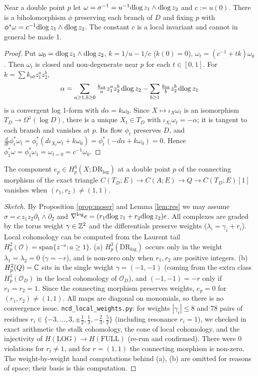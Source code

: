\begin{prop}\tP\label{prop:moser}
Near a double point $p$ let $\omega=\sigma^{-1}=u^{-1}\mathrm{dlog}\, z_1\wedge\mathrm{dlog}\, z_2$ and $c:=u(0)$. There is a biholomorphism $\phi$ preserving each branch of $D$ and fixing $p$ with $\phi^*\omega=c^{-1}\mathrm{dlog}\, z_1\wedge\mathrm{dlog}\, z_2$. The constant $c$ is a local invariant and cannot in general be made 1.
\end{prop}
\begin{proof}
Put $\omega_0=\mathrm{dlog}\, z_1\wedge\mathrm{dlog}\, z_2$, $k=1/u-1/c$ ($k(0)=0$), $\omega_t=(c^{-1}+tk)\omega_0$. Then $\omega_t$ is closed and non-degenerate near $p$ for each $t\in[0,1]$. For $k=\sum k_{ab}z_1^az_2^b$,
\[\alpha=\sum_{a\ge1,b\ge0}\tfrac{k_{ab}}{a}z_1^az_2^b\,\mathrm{dlog}\, z_2-\sum_{b\ge1}\tfrac{k_{0b}}{b}z_2^b\,\mathrm{dlog}\, z_1\]
is a convergent log 1-form with $d\alpha=k\omega_0$. Since $X\mapsto\iota_X\omega_t$ is an isomorphism $T_D\to\Omega^1(\log D)$, there is a unique $X_t\in T_D$ with $\iota_{X_t}\omega_t=-\alpha$; it is tangent to each branch and vanishes at $p$. Its flow $\phi_t$ preserves $D$, and $\tfrac d{dt}\phi_t^*\omega_t=\phi_t^*(d\iota_{X_t}\omega_t+k\omega_0)=\phi_t^*(-d\alpha+k\omega_0)=0$. Hence $\phi_1^*\omega=\phi_1^*\omega_1=\omega_{t=0}=c^{-1}\omega_0$. \qedhere
\end{proof}
\begin{lem}\tP \tV\label{lem:conn}
The component $e_p\in H^3_p(X;\mathrm{DR}_{\log})$ at a double point $p$ of the connecting morphism of the exact triangle $C(T_D;E)\to C(A;E)\to Q\to C(T_D;E)[1]$ vanishes when $(r_1,r_2)\ne(1,1)$.
\end{lem}
\begin{proof}[Sketch]
By Proposition \ref{prop:moser} and Lemma \ref{lem:res} we may assume $\sigma=c\,z_1z_2\partial_1\wedge\partial_2$ and $\nabla^{\log}e=(r_1\mathrm{dlog}\, z_1+r_2\mathrm{dlog}\, z_2)e$. All complexes are graded by the torus weight $\gamma\in\mathbb Z^2$ and the differentials preserve weights ($\lambda_i=\gamma_i+r_i$). Local cohomology can be computed from the Laurent tail $H^2_p(\mathcal O)=\mathrm{span}\{z^{-a}:a\ge1\}$. (a) $H^3_p(\mathrm{DR}_{\log})$ occurs only in the weight $\lambda_1=\lambda_2=0$ ($\gamma=-r$), and is non-zero only when $r_1,r_2$ are positive integers. (b) $H^2_p(Q)=\mathbb C$ sits in the single weight $\gamma=(-1,-1)$ (coming from the extra class $H^1_p(\mathcal O_D)$ in the local cohomology of $\mathcal O_D$), and $(-1,-1)=-r$ only if $r_1=r_2=1$. Since the connecting morphism preserves weights, $e_p=0$ for $(r_1,r_2)\ne(1,1)$. All maps are diagonal on monomials, so there is no convergence issue.
\tV \texttt{ncd\_local\_weights.py}: for weights $|\gamma_i|\le8$ and 78 pairs of residues $r_i\in\{-3,\dots,3,\pm\tfrac12,\tfrac13,-\tfrac23,\tfrac52\}$ (including resonance $r_i=1$), we checked in exact arithmetic the stalk cohomology, the cone of local cohomology, and the injectivity of $H(\mathrm{LOG})\to H(\mathrm{FULL})$ (re-run and confirmed). There were 0 violations for $r_i\neq1$, and for $r=(1,1)$ the connecting morphism is non-zero. The weight-by-weight hand computations behind (a), (b) are omitted for reasons of space; their basis is this computation. \qedhere
\end{proof}
